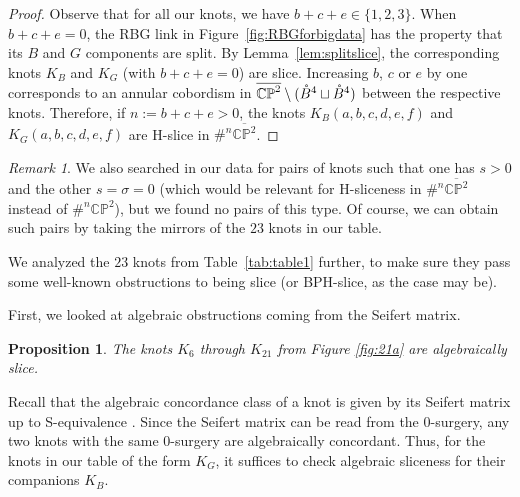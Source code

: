 \documentclass [11pt]{amsart}
\newtheorem {proposition}[theorem]{Proposition}
\theoremstyle{remark}
\newtheorem {remark}[theorem]{Remark}
\def\CP{\mathbb{CP}^2}
\def\bCP{\overline{\mathbb{CP}^2}}
\newcommand\intB{\smash{\mathring{B}^4}}
\begin{document}
\begin{proof}
Observe that for all our knots, we have $b+c+e\in \{1,2,3\}$. When $b+c+e=0$, the RBG link in Figure~\ref{fig:RBGforbigdata} has the property that its $B$ and $G$ components are split. By Lemma~\ref{lem:splitslice}, the corresponding knots $K_B$ and $K_G$  (with $b+c+e=0$) are slice. Increasing $b$, $c$ or $e$ by one corresponds to an annular cobordism in $\bCP \setminus (\intB \sqcup \intB)$ between the respective knots. Therefore, if $n:=b+c+e > 0$, the knots $K_B(a, b, c, d, e, f)$ and $K_G(a, b, c, d, e, f)$ are H-slice in $\#^n \bCP$. \end{proof} 

\begin{remark}\label{rem:sign}
We also searched in our data for pairs of knots such that one has $s > 0$ and the other $s=\sigma=0$ (which would be relevant for H-sliceness in $\#^n \bCP$ instead of $\#^n \CP$), but we found no pairs of this type. Of course, we can obtain such pairs by taking the mirrors of the $23$ knots in our table. 
\end{remark}

We analyzed the $23$ knots from Table~\ref{tab:table1} further, to make sure they pass some well-known obstructions to being slice (or BPH-slice, as the case may be).

First, we looked at algebraic obstructions coming from the Seifert matrix.
\begin{proposition}
\label{prop:algslice}
The knots $K_6$ through $K_{21}$ from Figure \ref{fig:21a} are algebraically slice.
\end{proposition}

 Recall that the algebraic concordance class of a knot is given by its Seifert matrix up to S-equivalence \cite{Levinealg, Trotter}. Since the Seifert matrix can be read from the 0-surgery, any two knots with the same 0-surgery are algebraically concordant. Thus, for the knots in our table of the form $K_G$, it suffices to check algebraic sliceness for their companions $K_B$.
\end{document}
